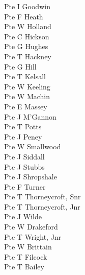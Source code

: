 \begin{multicols}{2}
  Pte I Goodwin \\
  Pte F Heath \\
  Pte W Holland \\
  Pte C Hickson \\
  Pte G Hughes \\
  Pte T Hackney \\
  Pte G Hill \\
  Pte T Kelsall \\
  Pte W Keeling \\
  Pte W Machin \\
  Pte E Massey \\
  Pte J M'Gannon \\
  Pte T Potts \\
  Pte J Peney \\
  Pte W Smallwood \\
  Pte J Siddall \\
  Pte J Stubbs \\
  Pte J Shropshale \\
  Pte F Turner \\
  Pte T Thorneycroft, Snr \\
  Pte T Thorneycroft, Jnr \\
  Pte J Wilde \\
  Pte W Drakeford \\
  Pte T Wright, Jnr \\
  Pte W Brittain \\
  Pte T Filcock \\
  Pte T Bailey \\
\end{multicols}
